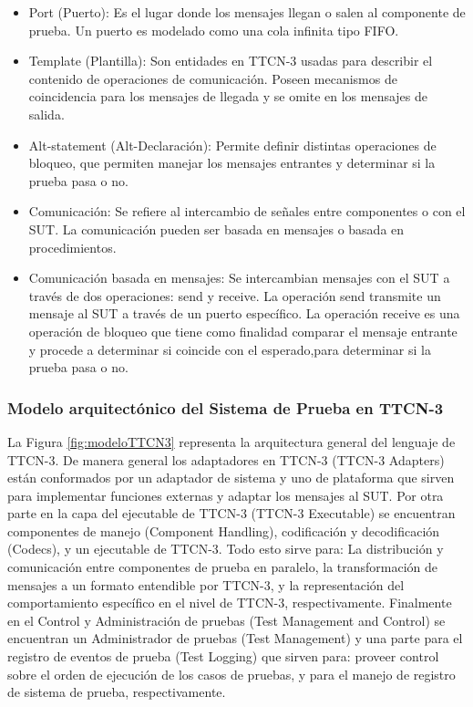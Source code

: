 \begin{itemize}
\begin{itemize}
la prueba.
\item Fail: Indica que el SUT no cumpli\'o con el prop\'osito de la prueba.
\item Error: Esta asignaci\'on la hace el ambiente de ejecuci\'on de TTCN-3 
cuando hay fallas en el componente de pruebas o en el SUT.
\item None: Es el valor inicial, cuando el veredicto no ha sido asignado.
\end{itemize}
\item Port (Puerto): Es el lugar donde los mensajes llegan o salen al 
componente de prueba. Un puerto es modelado como una cola infinita tipo FIFO.
\item Template (Plantilla): Son entidades en TTCN-3 usadas para describir el 
contenido de operaciones de comunicaci\'on. Poseen mecanismos de coincidencia 
para los mensajes de llegada y se omite en los mensajes de salida.
\item Alt-statement (Alt-Declaraci\'on): Permite definir distintas operaciones 
de bloqueo, que permiten manejar los mensajes entrantes y determinar si la 
prueba pasa o no.
\item Comunicaci\'on: Se refiere al intercambio de se\~nales entre componentes 
o con el SUT. La comunicaci\'on pueden ser basada en mensajes o basada en 
procedimientos.
\item Comunicaci\'on basada en mensajes: Se intercambian mensajes  con el SUT 
a trav\'es de dos operaciones: send y receive. La operaci\'on send transmite un 
mensaje al SUT a trav\'es de un puerto espec\'ifico. La operaci\'on receive  es 
una operaci\'on de bloqueo que tiene como finalidad comparar el mensaje entrante 
y procede a determinar si coincide con el esperado,para determinar si 
la prueba pasa o no.
\end{itemize}

\subsubsection{Modelo arquitect\'onico del Sistema de Prueba en TTCN-3}

La Figura \ref{fig:modeloTTCN3} representa la arquitectura general del lenguaje 
de TTCN-3. De manera general los adaptadores en TTCN-3 (TTCN-3 Adapters) est\'an 
conformados por un adaptador de sistema y uno de plataforma que sirven para 
implementar funciones externas y adaptar los mensajes al SUT. Por otra parte en 
la capa del ejecutable de TTCN-3 (TTCN-3 Executable) se encuentran componentes 
de manejo (Component Handling), codificaci\'on y decodificaci\'on (Codecs), y 
un ejecutable de TTCN-3. Todo esto sirve para: La distribuci\'on y 
comunicaci\'on entre componentes de prueba en paralelo, la transformaci\'on de 
mensajes a un formato entendible por TTCN-3, y la representaci\'on del 
comportamiento espec\'ifico en el nivel de TTCN-3, respectivamente. Finalmente 
en el Control y Administraci\'on de pruebas (Test Management and Control) se 
encuentran un Administrador de pruebas (Test Management) y una parte para el 
registro de eventos de prueba (Test Logging) que sirven para: proveer control 
sobre el orden de ejecuci\'on de los casos de pruebas, y para el manejo de 
registro de sistema de prueba, respectivamente.

